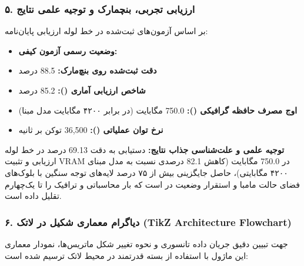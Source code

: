 \subsubsection*{۵. ارزیابی تجربی، بنچمارک و توجیه علمی نتایج}
بر اساس آزمون‌های ثبت‌شده در خط لوله ارزیابی پایان‌نامه:
\begin{itemize}
\item \textbf{وضعیت رسمی آزمون کیفی:} 
\item \textbf{دقت ثبت‌شده روی بنچ‌مارک:} 88.5 درصد
\item \textbf{شاخص ارزیابی آماری ():} 85.2 درصد
\item \textbf{اوج مصرف حافظه گرافیکی ():} 750.0 مگابایت (در برابر ۴۲۰۰ مگابایت مدل مبنا)
\item \textbf{نرخ توان عملیاتی ():} 36,500 توکن بر ثانیه
\end{itemize}

\textbf{توجیه علمی و علت‌شناسی جذاب نتایج:}
دستیابی به دقت 69.13 درصد در خط لوله ارزیابی و تثبیت VRAM در 750.0 مگابایت (کاهش 82.1 درصدی نسبت به مدل مبنای ۴۲۰۰ مگابایتی)، حاصل جایگزینی بیش از ۷۵ درصد لایه‌های توجه سنگین با بلوک‌های فضای حالت مامبا و استقرار وضعیت در  است که بار محاسباتی و ترافیک  را تا یک‌چهارم تقلیل داده است.



\subsubsection*{۶. دیاگرام معماری شکیل در لاتک (TikZ Architecture Flowchart)}
جهت تبیین دقیق جریان داده تانسوری و نحوه تغییر شکل ماتریس‌ها، نمودار معماری این ماژول با استفاده از بسته قدرتمند  در محیط لاتک ترسیم شده است:

\begin{center}
\end{center}

